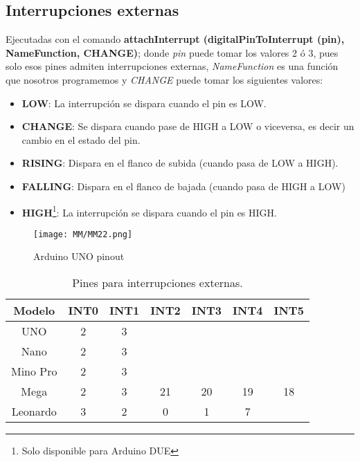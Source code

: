 \documentclass[
	12pt, %
	fleqn, %
	a4paper, %
	oneside, %
]{LegrandOrangeBook}
\begin{document}
\subsection{Interrupciones externas}
Ejecutadas con el comando \textbf{attachInterrupt (digitalPinToInterrupt (pin), NameFunction, CHANGE)}; donde \textit{pin} puede tomar los valores 2 ó 3, pues solo esos pines admiten interrupciones externas, \textit{NameFunction} es una función que nosotros programemos y \textit{CHANGE} puede tomar los siguientes valores:
\begin{itemize}
\item \textbf{LOW}: La interrupción se dispara cuando el pin es LOW.
\item \textbf{CHANGE}: Se dispara cuando pase de HIGH a LOW o viceversa, es decir un cambio en el estado del pin.
\item \textbf{RISING}: Dispara en el flanco de subida (cuando pasa de LOW a HIGH).
\item \textbf{FALLING}: Dispara en el flanco de bajada (cuando pasa de HIGH a LOW)
\item \textbf{HIGH}\footnote{Solo disponible para Arduino DUE}: La interrupción se dispara cuando el pin es HIGH.
\end{itemize}
\begin{figure}[]
\centering
\texttt{[image: MM/MM22.png]}
\caption{Arduino UNO pinout}
\label{fig:arduino pinout}
\end{figure}
\begin{table}[]
\begin{center}
\begin{tabular}{|c|c|c|c|c|c|c|}
\hline
\rowcolor[HTML]{34CDF9} 
Modelo   & INT0 & INT1 & INT2 & INT3 & INT4 & INT5 \\ \hline
UNO      & 2    & 3    &      &      &      &      \\ \hline
Nano     & 2    & 3    &      &      &      &      \\ \hline
Mino Pro & 2    & 3    &      &      &      &      \\ \hline
Mega     & 2    & 3    & 21   & 20   & 19   & 18   \\ \hline
Leonardo & 3    & 2    & 0    & 1    & 7    &      \\ \hline
\end{tabular}
\end{center}
\caption{Pines para interrupciones externas.}
\end{table}
\end{document}
